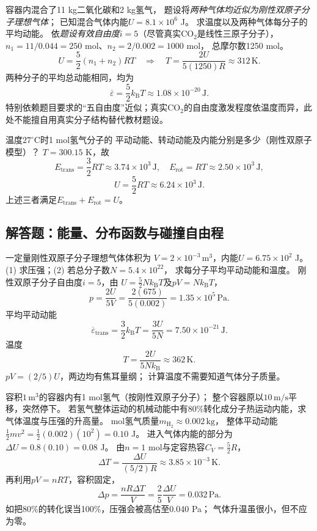 \problemtext 容器内混合了11 kg二氧化碳和2 kg氢气，
题设将\emph{两种气体均近似为刚性双原子分子理想气体}；
已知混合气体内能$U=8.1\times10^6$ J。
求温度以及两种气体每分子的平均动能。
\workings
依\emph{题设有效自由度$i=5$}（尽管真实CO$_2$是线性三原子分子），
$n_1=11/0.044=250$ mol、$n_2=2/0.002=1000$ mol，
总摩尔数1250 mol。
\[
U=\frac52(n_1+n_2)RT
\quad\Longrightarrow\quad
\boxed{T=\frac{2U}{5(1250)R}\approx312\,\mathrm K}.
\]
两种分子的平均总动能相同，均为
\[
\boxed{\overline\varepsilon
=\frac52k_{\mathrm B}T\approx1.08\times10^{-20}\,\mathrm J}.
\]
\crosscheck 特别依赖题目要求的“五自由度”近似；真实CO$_2$的自由度激发程度依温度而异，此处不能擅自用真实分子结构替代教材题设。

\problemtext 温度$27^\circ\mathrm C$时1 mol氢气分子的
平动动能、转动动能及内能分别是多少（刚性双原子模型）？
\workings
$T=300.15$ K，故
\[
\boxed{E_{\mathrm{trans}}=\frac32RT\approx3.74\times10^3\,\mathrm J},
\quad
\boxed{E_{\mathrm{rot}}=RT\approx2.50\times10^3\,\mathrm J},
\]
\[
\boxed{U=\frac52RT\approx6.24\times10^3\,\mathrm J}.
\]
\crosscheck 上述三者满足$E_{\mathrm{trans}}+E_{\mathrm{rot}}=U$。

\subsection{解答题：能量、分布函数与碰撞自由程}

\problemtext 一定量刚性双原子分子理想气体体积为
$V=2\times10^{-3}\,\mathrm{m^3}$，内能$U=6.75\times10^2$ J。
(1) 求压强；(2) 若总分子数$N=5.4\times10^{22}$，
求每分子平均平动动能和温度。
\workings
刚性双原子分子自由度$i=5$，由
$U=\tfrac52Nk_{\mathrm B}T$及$pV=Nk_{\mathrm B}T$，
\[
\boxed{p=\frac{2U}{5V}
=\frac{2(675)}{5(0.002)}
=1.35\times10^5\,\mathrm{Pa}}.
\]
平均平动动能
\[
\boxed{\overline\varepsilon_{\mathrm{trans}}
=\frac32k_{\mathrm B}T=\frac{3U}{5N}
=7.50\times10^{-21}\,\mathrm J}.
\]
温度
\[
\boxed{T=\frac{2U}{5Nk_{\mathrm B}}
\approx362\,\mathrm K}.
\]
\crosscheck $pV=(2/5)U$，两边均有焦耳量纲；
计算温度不需要知道气体分子质量。

\problemtext 容积$1\,\mathrm{m^3}$的容器内有1 mol氢气（按刚性双原子分子）；
整个容器原以$10\,\mathrm{m/s}$平移，突然停下。
若氢气整体运动的机械动能中有80\%转化成分子热运动内能，求气体温度与压强的升高量。
 mol氢气质量$m_{\mathrm H_2}\approx0.002\,\mathrm{kg}$，
整体平动动能
$\tfrac12mv^2=\tfrac12(0.002)(10^2)=0.10$ J。
进入气体内能的部分为
$\Delta U=0.8(0.10)=0.08$ J。
由$n=1$ mol与定容热容$C_V=\tfrac52R$，
\[
\boxed{\Delta T=\frac{\Delta U}{(5/2)R}
\approx3.85\times10^{-3}\,\mathrm K}.
\]
再利用$pV=nRT$，容积固定，
\[
\boxed{\Delta p=\frac{nR\Delta T}{V}
=\frac{2}{5}\frac{\Delta U}{V}
=0.032\,\mathrm{Pa}}.
\]
\crosscheck 如把80\%的转化误当100\%，压强会被高估至0.040 Pa；
气体升温虽很小，但不应为零。

